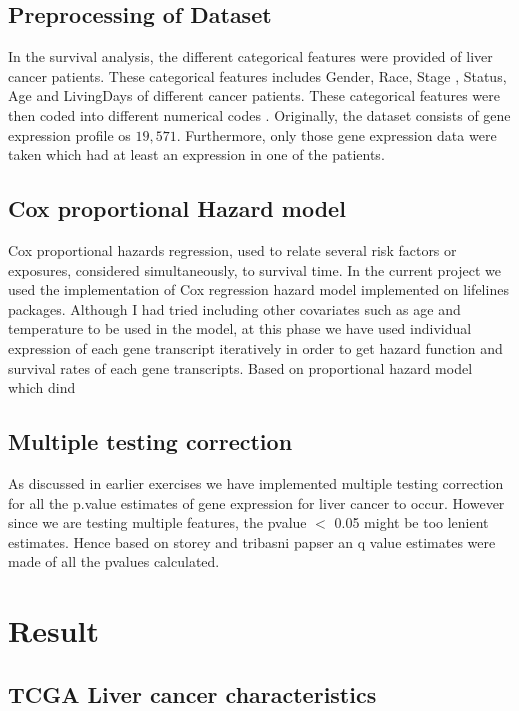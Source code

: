 \documentclass[a4paper,10pt]{article}
\begin{document}
	\subsection {Preprocessing of Dataset}
In the survival analysis, the different categorical features were provided of liver cancer patients. These categorical features includes Gender, Race, Stage , Status, Age and LivingDays of different cancer patients.  These categorical features were then coded into different numerical codes . Originally, the dataset consists of gene expression profile os $19,571$. Furthermore, only those gene expression data were taken which had at least an expression in one of the patients.  

	\subsection{Cox proportional Hazard model}
	 Cox proportional hazards regression, used to relate several risk factors or exposures, considered simultaneously, to survival time. In the current project we used the implementation of Cox regression hazard model implemented on lifelines packages. Although I had tried including other covariates such as age and temperature to be used in the model, at this phase we have used individual expression of each gene transcript iteratively in order to get hazard function and survival rates of each gene transcripts. Based on proportional hazard model which dind
	 
	\subsection {Multiple testing correction}
	As discussed in earlier exercises we have  implemented multiple testing correction for all the p.value estimates of gene expression for liver cancer to occur. However since we are testing multiple features, the pvalue $<$ 0.05 might be too lenient estimates. Hence based on storey and tribasni papser \cite {} an q value estimates were made of all the pvalues calculated.
	 


 \section{Result}
 
 	\subsection {TCGA Liver cancer characteristics}
 
\end{document}
